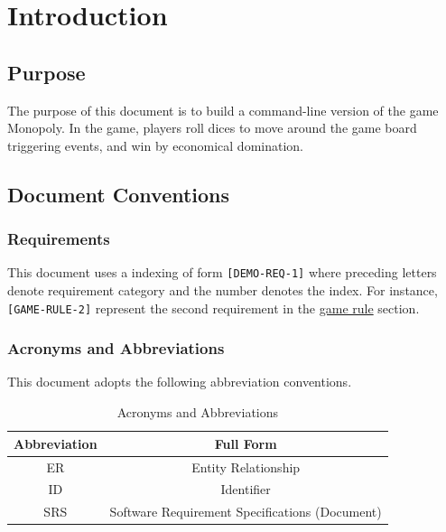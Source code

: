 
\chapter{Introduction}
\label{ch:intro}

  \section{Purpose}
  The purpose of this document is to build a command-line version of the game Monopoly. In the game, players roll dices to move around the game board triggering events, and win by economical domination. \par

  \section{Document Conventions}

    \subsection{Requirements}
      This document uses a indexing of form \texttt{[DEMO-REQ-1]} where preceding letters denote requirement category and the number denotes the index. For instance, \texttt{[GAME-RULE-2]} represent the second requirement in the \hyperref[sec:game-rules]{game rule} section. \par

    \subsection{Acronyms and Abbreviations}
      This document adopts the following abbreviation conventions. \par
      \begin{table}[!htbp]
        \centering
        \begin{tabular}{*2c}
          \toprule
          Abbreviation & Full Form \\
          \midrule
          ER & Entity Relationship \\
          ID & Identifier \\
          SRS & Software Requirement Specifications (Document) \\
          \bottomrule
        \end{tabular}
        \caption{Acronyms and Abbreviations}
        \label{table:abbr}
      \end{table}

